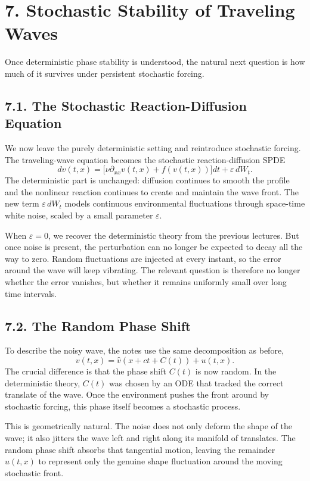 \documentclass[11pt]{article}
\theoremstyle{definition}
\theoremstyle{remark}
\begin{document}
\section*{7. Stochastic Stability of Traveling Waves}
Once deterministic phase stability is understood, the natural next question is how much of it survives under persistent stochastic forcing.

\subsection*{7.1. The Stochastic Reaction-Diffusion Equation}
We now leave the purely deterministic setting and reintroduce stochastic forcing. The traveling-wave equation becomes the stochastic reaction-diffusion SPDE
\[
dv(t,x)=\bigl[\nu\partial_{xx}v(t,x)+f(v(t,x))\bigr]dt+\varepsilon\,dW_t.
\]
The deterministic part is unchanged: diffusion continues to smooth the profile and the nonlinear reaction continues to create and maintain the wave front. The new term \(\varepsilon\,dW_t\) models continuous environmental fluctuations through space-time white noise, scaled by a small parameter \(\varepsilon\).

When \(\varepsilon=0\), we recover the deterministic theory from the previous lectures. But once noise is present, the perturbation can no longer be expected to decay all the way to zero. Random fluctuations are injected at every instant, so the error around the wave will keep vibrating. The relevant question is therefore no longer whether the error vanishes, but whether it remains uniformly small over long time intervals.

\subsection*{7.2. The Random Phase Shift}
To describe the noisy wave, the notes use the same decomposition as before,
\[
v(t,x)=\widehat v(x+ct+C(t))+u(t,x).
\]
The crucial difference is that the phase shift \(C(t)\) is now random. In the deterministic theory, \(C(t)\) was chosen by an ODE that tracked the correct translate of the wave. Once the environment pushes the front around by stochastic forcing, this phase itself becomes a stochastic process.

This is geometrically natural. The noise does not only deform the shape of the wave; it also jitters the wave left and right along its manifold of translates. The random phase shift absorbs that tangential motion, leaving the remainder \(u(t,x)\) to represent only the genuine shape fluctuation around the moving stochastic front.
\end{document}
